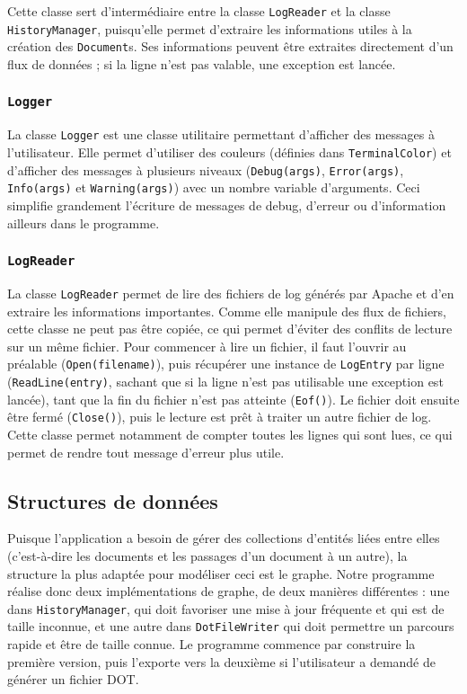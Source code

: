 \documentclass[11pt,a4paper]{article}
\begin{document}
	Cette classe sert d'intermédiaire entre la classe \texttt{LogReader} et la classe \texttt{HistoryManager}, puisqu'elle permet d'extraire les informations utiles à la création des \texttt{Document}s. Ses informations peuvent être extraites directement d'un flux de données ; si la ligne n'est pas valable, une exception est lancée.
	
	\subsubsection{\texttt{Logger}}
	
	La classe \texttt{Logger} est une classe utilitaire permettant d'afficher des messages à l'utilisateur. Elle permet d'utiliser des couleurs (définies dans \texttt{TerminalColor}) et d'afficher des messages à plusieurs niveaux (\texttt{Debug(args)}, \texttt{Error(args)}, \texttt{Info(args)} et \texttt{Warning(args)}) avec un nombre variable d'arguments. Ceci simplifie grandement l'écriture de messages de debug, d'erreur ou d'information ailleurs dans le programme.
	
	\subsubsection{\texttt{LogReader}}
	
	La classe \texttt{LogReader} permet de lire des fichiers de log générés par Apache et d'en extraire les informations importantes. Comme elle manipule des flux de fichiers, cette classe ne peut pas être copiée, ce qui permet d'éviter des conflits de lecture sur un même fichier. Pour commencer à lire un fichier, il faut l'ouvrir au préalable (\texttt{Open(filename)}), puis récupérer une instance de \texttt{LogEntry} par ligne (\texttt{ReadLine(entry)}, sachant que si la ligne n'est pas utilisable une exception est lancée), tant que la fin du fichier n'est pas atteinte (\texttt{Eof()}). Le fichier doit ensuite être fermé (\texttt{Close()}), puis le lecture est prêt à traiter un autre fichier de log. Cette classe permet notamment de compter toutes les lignes qui sont lues, ce qui permet de rendre tout message d'erreur plus utile.
	
	\subsection{Structures de données}
	
	Puisque l'application a besoin de gérer des collections d'entités liées entre elles (c'est-à-dire les documents et les passages d'un document à un autre), la structure la plus adaptée pour modéliser ceci est le graphe. Notre programme réalise donc deux implémentations de graphe, de deux manières différentes : une dans \texttt{HistoryManager}, qui doit favoriser une mise à jour fréquente et qui est de taille inconnue, et une autre dans \texttt{DotFileWriter} qui doit permettre un parcours rapide et être de taille connue. Le programme commence par construire la première version, puis l'exporte vers la deuxième si l'utilisateur a demandé de générer un fichier DOT.
	
\end{document}
